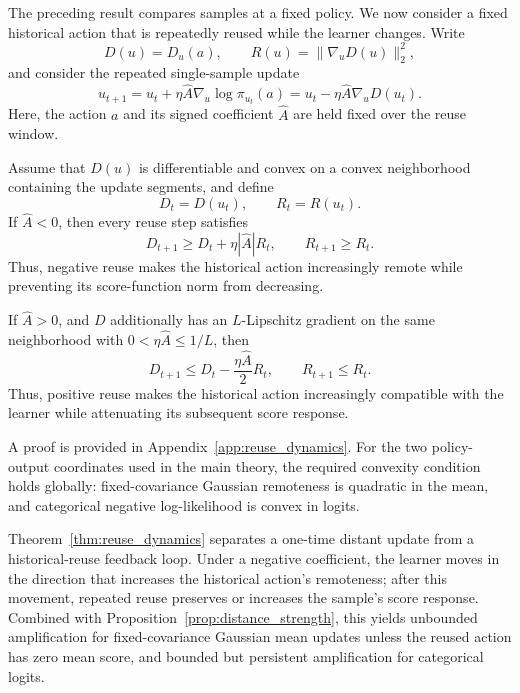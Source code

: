 The preceding result compares samples at a fixed policy. We now consider
a fixed historical action that is repeatedly reused while the learner
changes. Write
\[
    D(u)=D_u(a),
    \qquad
    R(u)=\|\nabla_uD(u)\|_2^2,
\]
and consider the repeated single-sample update
\begin{equation}
    u_{t+1}
    =
    u_t
    +
    \eta\widehat A\nabla_u\log\pi_{u_t}(a)
    =
    u_t
    -
    \eta\widehat A\nabla_uD(u_t).
    \label{eq:single_sample_reuse_update}
\end{equation}
Here, the action \(a\) and its signed coefficient \(\widehat A\) are
held fixed over the reuse window.

\begin{theorem}
\label{thm:reuse_dynamics}
Assume that \(D(u)\) is differentiable and convex on a convex
neighborhood containing the update segments, and define
\[
    D_t=D(u_t),
    \qquad
    R_t=R(u_t).
\]
If \(\widehat A<0\), then every reuse step satisfies
\begin{equation}
    D_{t+1}
    \ge
    D_t+\eta|\widehat A|R_t,
    \qquad
    R_{t+1}\ge R_t.
    \label{eq:negative_reuse_amplification}
\end{equation}
Thus, negative reuse makes the historical action increasingly remote
while preventing its score-function norm from decreasing.

If \(\widehat A>0\), and \(D\) additionally has an \(L\)-Lipschitz
gradient on the same neighborhood with \(0<\eta\widehat A\le 1/L\), then
\begin{equation}
    D_{t+1}
    \le
    D_t-\frac{\eta\widehat A}{2}R_t,
    \qquad
    R_{t+1}\le R_t.
    \label{eq:positive_reuse_attenuation}
\end{equation}
Thus, positive reuse makes the historical action increasingly compatible
with the learner while attenuating its subsequent score response.
\end{theorem}

A proof is provided in Appendix~\ref{app:reuse_dynamics}. For the two
policy-output coordinates used in the main theory, the required convexity
condition holds globally: fixed-covariance Gaussian remoteness is
quadratic in the mean, and categorical negative log-likelihood is convex
in logits.

Theorem~\ref{thm:reuse_dynamics} separates a one-time distant update from
a historical-reuse feedback loop. Under a negative coefficient, the
learner moves in the direction that increases the historical action's
remoteness; after this movement, repeated reuse preserves or increases
the sample's score response. Combined with
Proposition~\ref{prop:distance_strength}, this yields unbounded
amplification for fixed-covariance Gaussian mean updates unless the
reused action has zero mean score, and bounded but persistent
amplification for categorical logits.

